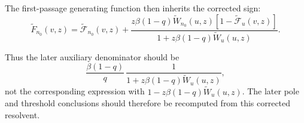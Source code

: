 \documentclass[11pt]{article}
\begin{document}
The first-passage generating function then inherits the corrected sign:
\[
\boxed{
\widetilde F_{n_0}(v,z)
=\widetilde{\mathcal F}_{n_0}(v,z)
+\frac{
z\beta(1-q)\widetilde W_{n_0}(u,z)
\left[1-\widetilde{\mathcal F}_u(v,z)\right]
}{
1+z\beta(1-q)\widetilde W_u(u,z)
}.}
\]

Thus the later auxiliary denominator should be
\[
\frac{\beta(1-q)}{q}\,
\frac{1}{1+z\beta(1-q)\widetilde W_u(u,z)},
\]
not the corresponding expression with $1-z\beta(1-q)\widetilde W_u(u,z)$.
The later pole and threshold conclusions should therefore be recomputed from
this corrected resolvent.
\end{document}
